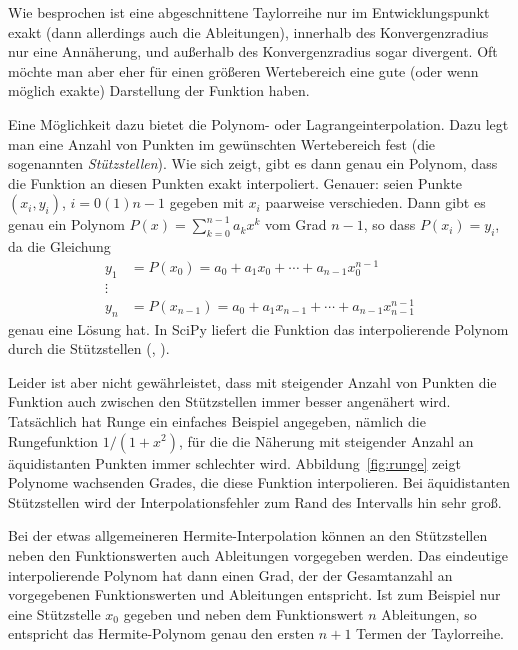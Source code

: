 Wie besprochen ist eine abgeschnittene Taylorreihe nur im
Entwicklungspunkt exakt (dann allerdings auch die Ableitungen),
innerhalb des Konvergenzradius nur eine Annäherung, und außerhalb des
Konvergenzradius sogar divergent.  Oft möchte man aber eher für einen
größeren Wertebereich eine gute (oder wenn möglich exakte) Darstellung
der Funktion haben.

Eine Möglichkeit dazu bietet die Polynom- oder
Lagrangeinterpolation. Dazu legt man eine Anzahl von Punkten im
gewünschten Wertebereich fest (die sogenannten \emph{Stützstellen}).
Wie sich zeigt, gibt es dann genau ein Polynom, dass die Funktion an
diesen Punkten exakt interpoliert. Genauer: seien Punkte $(x_i, y_i)$,
$i=0(1)n-1$ gegeben mit $x_i$ paarweise verschieden. Dann gibt es
genau ein Polynom $P(x)=\sum_{k=0}^{n-1} a_kx^{k}$ vom Grad $n-1$, so
dass $P(x_i) = y_i$, da die Gleichung
\begin{equation}
  \begin{split}
    y_1 &= P(x_0) = a_0 + a_1 x_0 + \cdots + a_{n-1}x_0^{n-1}\\
    \vdots\\
    y_n &= P(x_{n-1}) = a_0 + a_1 x_{n-1} + \cdots + a_{n-1}x_{n-1}^{n-1}
  \end{split}
  \label{eq:interpol}
\end{equation}
genau eine Lösung hat.  In SciPy liefert die Funktion
 das interpolierende Polynom
durch die Stützstellen (, ).

Leider ist aber nicht gewährleistet, dass mit steigender Anzahl von
Punkten die Funktion auch zwischen den Stützstellen immer besser
angenähert wird. Tatsächlich hat Runge ein einfaches Beispiel
angegeben, nämlich die Rungefunktion $1/(1+x^2)$, für die die Näherung
mit steigender Anzahl an äquidistanten Punkten immer schlechter
wird. Abbildung~\ref{fig:runge} zeigt Polynome wachsenden Grades, die
diese Funktion interpolieren. Bei äquidistanten Stützstellen wird der
Interpolationsfehler zum Rand des Intervalls hin sehr groß.

Bei der etwas allgemeineren Hermite-Interpolation können an den
Stützstellen neben den Funktionswerten auch Ableitungen vorgegeben
werden. Das eindeutige interpolierende Polynom hat dann einen Grad,
der der Gesamtanzahl an vorgegebenen Funktionswerten und Ableitungen
entspricht. Ist zum Beispiel nur eine Stützstelle $x_0$ gegeben und
neben dem Funktionswert $n$ Ableitungen, so entspricht das
Hermite-Polynom genau den ersten $n+1$ Termen der Taylorreihe.

